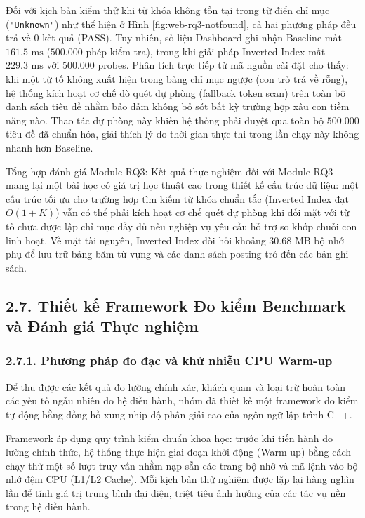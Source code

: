 \documentclass[14pt,a4paper]{extarticle}
\begin{document}
Đối với kịch bản kiểm thử khi từ khóa không tồn tại trong từ điển chỉ mục (\texttt{"Unknown"}) như thể hiện ở Hình \ref{fig:web-rq3-notfound}, cả hai phương pháp đều trả về $0$ kết quả (PASS). Tuy nhiên, số liệu Dashboard ghi nhận Baseline mất $161.5\text{ ms}$ ($500.000$ phép kiểm tra), trong khi giải pháp Inverted Index mất $229.3\text{ ms}$ với $500.000$ probes. Phân tích trực tiếp từ mã nguồn cài đặt cho thấy: khi một từ tố không xuất hiện trong bảng chỉ mục ngược (con trỏ trả về rỗng), hệ thống kích hoạt cơ chế dò quét dự phòng (fallback token scan) trên toàn bộ danh sách tiêu đề nhằm bảo đảm không bỏ sót bất kỳ trường hợp xâu con tiềm năng nào. Thao tác dự phòng này khiến hệ thống phải duyệt qua toàn bộ $500.000$ tiêu đề đã chuẩn hóa, giải thích lý do thời gian thực thi trong lần chạy này không nhanh hơn Baseline.

Tổng hợp đánh giá Module RQ3: Kết quả thực nghiệm đối với Module RQ3 mang lại một bài học có giá trị học thuật cao trong thiết kế cấu trúc dữ liệu: một cấu trúc tối ưu cho trường hợp tìm kiếm từ khóa chuẩn tắc (Inverted Index đạt $O(1 + K)$) vẫn có thể phải kích hoạt cơ chế quét dự phòng khi đối mặt với từ tố chưa được lập chỉ mục đầy đủ nếu nghiệp vụ yêu cầu hỗ trợ so khớp chuỗi con linh hoạt. Về mặt tài nguyên, Inverted Index đòi hỏi khoảng $30.68\text{ MB}$ bộ nhớ phụ để lưu trữ bảng băm từ vựng và các danh sách posting trỏ đến các bản ghi sách.

\subsection*{2.7. Thiết kế Framework Đo kiểm Benchmark và Đánh giá Thực nghiệm}

\subsubsection*{2.7.1. Phương pháp đo đạc và khử nhiễu CPU Warm-up}

Để thu được các kết quả đo lường chính xác, khách quan và loại trừ hoàn toàn các yếu tố ngẫu nhiên do hệ điều hành, nhóm đã thiết kế một framework đo kiểm tự động bằng đồng hồ xung nhịp độ phân giải cao của ngôn ngữ lập trình C++.

Framework áp dụng quy trình kiểm chuẩn khoa học: trước khi tiến hành đo lường chính thức, hệ thống thực hiện giai đoạn khởi động (Warm-up) bằng cách chạy thử một số lượt truy vấn nhằm nạp sẵn các trang bộ nhớ và mã lệnh vào bộ nhớ đệm CPU (L1/L2 Cache). Mỗi kịch bản thử nghiệm được lặp lại hàng nghìn lần để tính giá trị trung bình đại diện, triệt tiêu ảnh hưởng của các tác vụ nền trong hệ điều hành.
\end{document}
